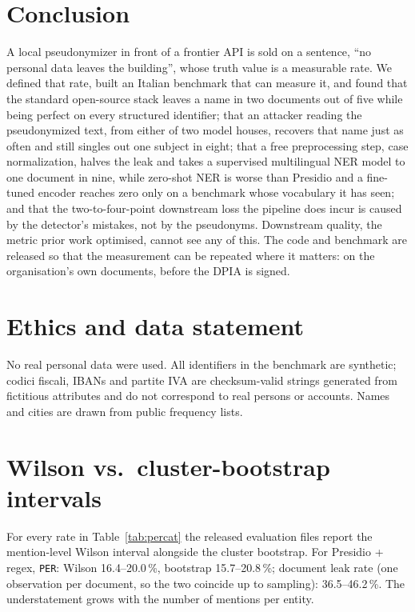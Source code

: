 \documentclass[11pt,a4paper]{article}
\newcommand{\pseud}[1]{\texttt{#1}}
\begin{document}
\section{Conclusion}
A local pseudonymizer in front of a frontier API is sold on a sentence, ``no personal data leaves the building'', whose truth value is a measurable rate. We defined that rate, built an Italian benchmark that can measure it, and found that the standard open-source stack leaves a name in two documents out of five while being perfect on every structured identifier; that an attacker reading the pseudonymized text, from either of two model houses, recovers that name just as often and still singles out one subject in eight; that a free preprocessing step, case normalization, halves the leak and takes a supervised multilingual NER model to one document in nine, while zero-shot NER is worse than Presidio and a fine-tuned encoder reaches zero only on a benchmark whose vocabulary it has seen; and that the two-to-four-point downstream loss the pipeline does incur is caused by the detector's mistakes, not by the pseudonyms. Downstream quality, the metric prior work optimised, cannot see any of this. The code and benchmark are released so that the measurement can be repeated where it matters: on the organisation's own documents, before the DPIA is signed.

\section*{Ethics and data statement}
No real personal data were used. All identifiers in the benchmark are synthetic; codici fiscali, IBANs and partite IVA are checksum-valid strings generated from fictitious attributes and do not correspond to real persons or accounts. Names and cities are drawn from public frequency lists.




\appendix
\section{Wilson vs.\ cluster-bootstrap intervals}
For every rate in Table~\ref{tab:percat} the released evaluation files report the mention-level Wilson interval alongside the cluster bootstrap. For Presidio + regex, \pseud{PER}: Wilson 16.4--20.0\,\%, bootstrap 15.7--20.8\,\%; document leak rate (one observation per document, so the two coincide up to sampling): 36.5--46.2\,\%. The understatement grows with the number of mentions per entity.
\end{document}
